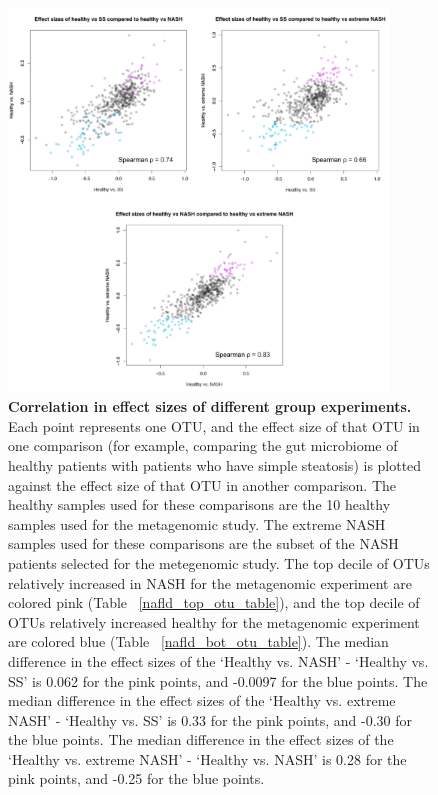 \begin{figure}[h]
\begin{center}
\includegraphics[width=0.9\textwidth]{nafld_16s_effect_sizes.png}
\caption[Correlation in effect sizes of different group experiments.]{\textbf{Correlation in effect sizes of different group experiments.} Each point represents one OTU, and the effect size of that OTU in one comparison (for example, comparing the gut microbiome of healthy patients with patients who have simple steatosis) is plotted against the effect size of that OTU in another comparison. The healthy samples used for these comparisons are the 10 healthy samples used for the metagenomic study. The extreme NASH samples used for these comparisons are the subset of the NASH patients selected for the metegenomic study. The top decile of OTUs relatively increased in NASH for the metagenomic experiment are colored pink (Table ~\ref{nafld_top_otu_table}), and the top decile of OTUs relatively increased healthy for the metagenomic experiment are colored blue (Table ~\ref{nafld_bot_otu_table}). The median difference in the effect sizes of the `Healthy vs. NASH' - `Healthy vs. SS' is 0.062 for the pink points, and -0.0097 for the blue points. The median difference in the effect sizes of the `Healthy vs. extreme NASH' - `Healthy vs. SS' is 0.33 for the pink points, and -0.30 for the blue points. The median difference in the effect sizes of the `Healthy vs. extreme NASH' - `Healthy vs. NASH' is 0.28 for the pink points, and -0.25 for the blue points. }
\label{nafld_fig4}
\end{center}
\end{figure}

